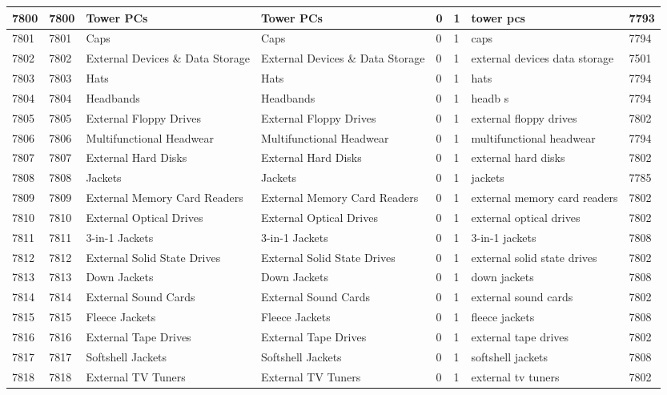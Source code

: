 \begin{longtable}{|l|l|l|l|l|l|l|l|}
7800 & 7800 & Tower PCs & Tower PCs & 0 & 1 & tower pcs & 7793 \\ \hline 
7801 & 7801 & Caps & Caps & 0 & 1 & caps & 7794 \\ \hline 
7802 & 7802 & External Devices \& Data Storage & External Devices \& Data Storage & 0 & 1 & external devices data storage & 7501 \\ \hline 
7803 & 7803 & Hats & Hats & 0 & 1 & hats & 7794 \\ \hline 
7804 & 7804 & Headbands & Headbands & 0 & 1 & headb s & 7794 \\ \hline 
7805 & 7805 & External Floppy Drives & External Floppy Drives & 0 & 1 & external floppy drives & 7802 \\ \hline 
7806 & 7806 & Multifunctional Headwear & Multifunctional Headwear & 0 & 1 & multifunctional headwear & 7794 \\ \hline 
7807 & 7807 & External Hard Disks & External Hard Disks & 0 & 1 & external hard disks & 7802 \\ \hline 
7808 & 7808 & Jackets & Jackets & 0 & 1 & jackets & 7785 \\ \hline 
7809 & 7809 & External Memory Card Readers & External Memory Card Readers & 0 & 1 & external memory card readers & 7802 \\ \hline 
7810 & 7810 & External Optical Drives & External Optical Drives & 0 & 1 & external optical drives & 7802 \\ \hline 
7811 & 7811 & 3-in-1 Jackets & 3-in-1 Jackets & 0 & 1 & 3-in-1 jackets & 7808 \\ \hline 
7812 & 7812 & External Solid State Drives & External Solid State Drives & 0 & 1 & external solid state drives & 7802 \\ \hline 
7813 & 7813 & Down Jackets & Down Jackets & 0 & 1 & down jackets & 7808 \\ \hline 
7814 & 7814 & External Sound Cards & External Sound Cards & 0 & 1 & external sound cards & 7802 \\ \hline 
7815 & 7815 & Fleece Jackets & Fleece Jackets & 0 & 1 & fleece jackets & 7808 \\ \hline 
7816 & 7816 & External Tape Drives & External Tape Drives & 0 & 1 & external tape drives & 7802 \\ \hline 
7817 & 7817 & Softshell Jackets & Softshell Jackets & 0 & 1 & softshell jackets & 7808 \\ \hline 
7818 & 7818 & External TV Tuners & External TV Tuners & 0 & 1 & external tv tuners & 7802 \\ \hline 

\end{longtable}
